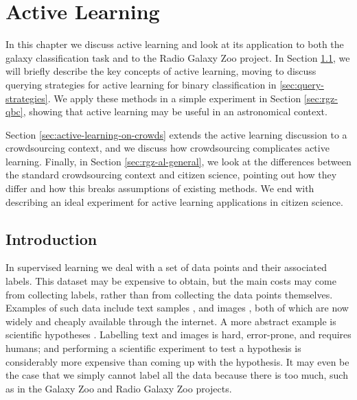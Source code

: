 
\chapter{Active Learning}
\label{cha:active-learning}

In this chapter we discuss active learning and look at its application to both
the galaxy classification task and to the Radio Galaxy Zoo project. In Section
\ref{sec:intro-active-learning}, we will briefly describe the key concepts of
active learning, moving to discuss querying strategies for active learning for
binary classification in \ref{sec:query-strategies}. We apply these methods in a
simple experiment in Section \ref{sec:rgz-qbc}, showing that active learning may
be useful in an astronomical context.

Section \ref{sec:active-learning-on-crowds} extends the active learning
discussion to a crowdsourcing context, and we discuss how crowdsourcing
complicates active learning. Finally, in Section \ref{sec:rgz-al-general}, we
look at the differences between the standard crowdsourcing context and citizen
science, pointing out how they differ and how this breaks assumptions of
existing methods. We end with describing an ideal experiment for active learning
applications in citizen science.

\section{Introduction}
\label{sec:intro-active-learning}
    
    In supervised learning we deal with a set of data points and their
    associated labels. This dataset may be expensive to obtain, but the main
    costs may come from collecting labels, rather than from collecting the data
    points themselves. Examples of such data include text samples
    \citep{lewis94, mccallum98}, and images \citep{loy11, lintott08}, both of
    which are now widely and cheaply available through the internet. A more
    abstract example is scientific hypotheses \citep{king04}. Labelling text and
    images is hard, error-prone, and requires humans; and performing a
    scientific experiment to test a hypothesis is considerably more expensive
    than coming up with the hypothesis. It may even be the case that we simply
    cannot label all the data because there is too much, such as in the Galaxy
    Zoo \citep{lintott08} and Radio Galaxy Zoo \citep{banfield15} projects.

